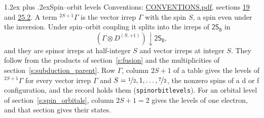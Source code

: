 \documentclass[10pt,a4paper]{article}
\makeatletter
\renewcommand\section{\@startsection{section}{1}{\z@}{-3ex plus -1ex minus -.2ex}%
  {1.2ex plus .2ex}{\normalfont\large\sffamily\bfseries\color{parttitle}}}
\numberwithin{equation}{section}
\newcommand{\grp}[1]{\mathsf{#1}}
\newcommand{\restr}[2]{#1\!\downarrow#2}
\newcommand{\irrJp}[2]{D^{(#1,#2)}}
\newcommand{\irrprod}{\otimes}
\newcommand{\term}[2]{{}^{#1}#2}
\makeatother
\begin{document}
\section{Spin--orbit levels}\label{s:spin_orbit}
Conventions: \href{../../CONVENTIONS.pdf}{CONVENTIONS.pdf}, sections \href{../../../rotation/CONVENTIONS.pdf\#conv.19}{19} and \href{../../CONVENTIONS.pdf\#conv.25.2}{25.2}.
\leavevmode\label{n:local.spin}\label{n:symbol.term}A term $\term{2S+1}{\Gamma}$ is the vector irrep $\Gamma$ with the spin $S$, a spin even under the inversion. Under spin--orbit coupling it splits into the irreps of $\grp{2S_{8}}$ in
\begin{equation}\label{e:spinorbit}\restr{(\Gamma \irrprod \irrJp{S}{+1})}{\grp{2S_{8}}},\end{equation}
and they are spinor irreps at half-integer $S$ and vector irreps at integer $S$. They follow from the products of section~\ref{s:fusion} and the multiplicities of section~\ref{s:subduction_parent}. Row $\Gamma$, column $2S + 1$ of a table gives the levels of $\term{2S+1}{\Gamma}$ for every vector irrep $\Gamma$ and $S = \nicefrac{1}{2}, 1, \dots, \nicefrac{7}{2}$, the nonzero spins of a d or f configuration, and the record holds them (\texttt{spinorbitlevels}). For an orbital level of section~\ref{s:spin_orbitals}, column $2S + 1 = 2$ gives the levels of one electron, and that section gives their states.
\end{document}
